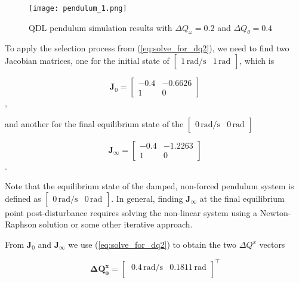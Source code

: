 \begin{figure}[h]
    \label{fig:pendulum_1}
    \centering
    \texttt{[image: pendulum\_1.png]}
    \caption{QDL pendulum simulation results with $\Delta Q_\omega = 0.2$ and $\Delta Q_\theta = 0.4$}
\end{figure}

To apply the selection process from (\ref{eq:solve_for_dq2}), we need to find two Jacobian matrices, one for the initial state of $\begin{bmatrix} 1 \,\text{rad/s} & 1 \,\text{rad} \end{bmatrix}$, which is 
 
\begin{equation} \label{eq:pendulum_jac1}
\mathbf{J}_{0} =
\begin{bmatrix}
-0.4 & -0.6626 \\
1 & 0
\end{bmatrix}
\end{equation},

and another for the final equilibrium state of the $\begin{bmatrix} 0\,\text{rad/s} & 0\,\text{rad} \end{bmatrix}$

\begin{equation} \label{eq:pendulum_jac2}
\mathbf{J}_{\infty} =
\begin{bmatrix}
-0.4 & -1.2263 \\
1 & 0
\end{bmatrix}
\end{equation}.

Note that the equilibrium state of the damped, non-forced pendulum system is defined as $\begin{bmatrix} 0\,\text{rad/s} & 0\,\text{rad} \end{bmatrix}$. In general, finding $\mathbf{J}_{\infty}$ at the final equilibrium point post-disturbance requires solving the non-linear system using a Newton-Raphson solution or some other iterative approach.

From $\mathbf{J}_{0}$ and $\mathbf{J}_{\infty}$ we use (\ref{eq:solve_for_dq2}) to obtain the two $\Delta Q^x$ vectors

\begin{equation} \label{eq:pendulum_dq1}
\mathbf{\Delta Q^x_{0}} =
\begin{bmatrix}
\ 0.4 \,\text{rad/s} & 0.1811 \,\text{rad} \\
\end{bmatrix}^\top
\end{equation}

